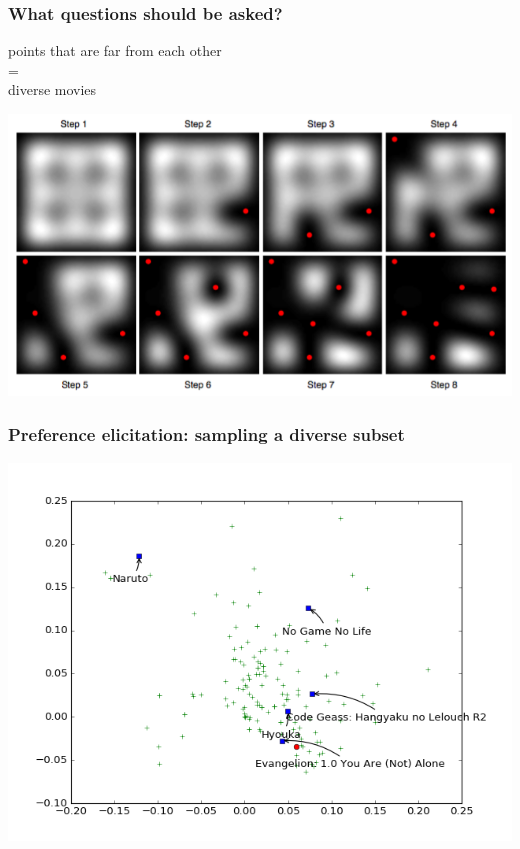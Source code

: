 \documentclass[]{beamer}
\begin{document}
\begin{frame}
  \frametitle{What questions should be asked?}
  \centering
  points that are \alert{far from each other}\\
  =\\
  \alert{diverse} movies\bigskip

  \includegraphics[width=\linewidth]{figures/dpp.png}
\end{frame}

\begin{frame}
  \frametitle{Preference elicitation: sampling a diverse subset}
  \includegraphics[width=\linewidth]{figures/1.png}
\end{frame}
\end{document}
